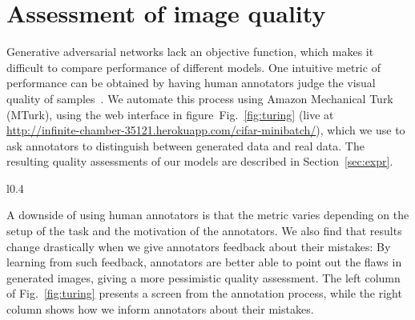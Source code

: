\documentclass{article} \usepackage{nips14submit_e,times}
\newcommand{\fig}[1]{Fig.~\ref{fig:#1}}
\newcommand{\secc}[1]{Section~\ref{sec:#1}}
\begin{document}
\section{Assessment of image quality}
\label{sec:qual}
Generative adversarial networks lack an objective function, which makes it difficult to compare performance of different models. One intuitive metric of performance can be obtained by having human annotators judge the visual quality of samples~\cite{denton2015deep}.
We automate this process using Amazon Mechanical Turk (MTurk),
using the web interface in figure~\fig{turing} (live at \url{http://infinite-chamber-35121.herokuapp.com/cifar-minibatch/}), which we use to ask annotators to distinguish between generated data and real data. The resulting quality assessments of our models are described in \secc{expr}.
\begin{wrapfigure}[11]{l}{0.4\textwidth}
    \hfill
	\caption{Web interface given to annotators. Annotators are asked to distinguish computer generated images from real ones.}
\label{fig:turing}
\end{wrapfigure}

A downside of using human annotators is that the metric varies depending on the setup of the task and the motivation of the annotators. We also find that results change drastically when we give annotators feedback about their mistakes: By learning from such feedback, annotators are better able to point out the flaws in generated images, giving a more pessimistic quality assessment. The left column of \fig{turing} presents a screen from the annotation process, while the right column shows how we inform annotators about their mistakes.
\end{document}
